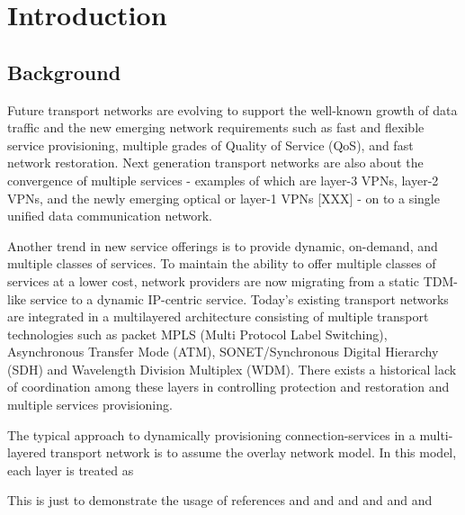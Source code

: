 \chapter{Introduction}
\label{chapter.Introduction}

\section{Background}
Future transport networks are evolving to support the well-known growth of data traffic and the new emerging network requirements such as fast and flexible service provisioning, multiple grades of Quality of Service (QoS), and fast network restoration. Next generation transport networks are also about the convergence of multiple services - examples of which are layer-3 VPNs, layer-2 VPNs, and the newly emerging optical or layer-1 VPNs [XXX] - on to a single unified data communication network.

Another trend in new service offerings is to provide dynamic, on-demand, and multiple classes of services. To maintain the ability to offer multiple classes of services at a lower cost, network providers are now migrating from a static TDM-like service to a dynamic IP-centric service. Today's existing transport networks are integrated in a multilayered architecture consisting of multiple transport technologies such as packet  \gls{MPLS} (Multi Protocol Label Switching), Asynchronous Transfer Mode (ATM), SONET/Synchronous Digital Hierarchy (SDH) and Wavelength Division Multiplex (WDM). There exists a historical lack of coordination among these layers in controlling protection and restoration and multiple services provisioning.

The typical approach to dynamically provisioning connection-services in a multi-layered transport network is to assume the overlay network model. In this model, each layer is treated as 

This is just to demonstrate the usage of references \cite{saad.book} and \cite{saad1.book} and \cite{saad.book} and \cite{knuth.book} and \cite{zhang.article_typical} and \cite{okada.articledualmonths} and \cite{gupta.conf_typical}

